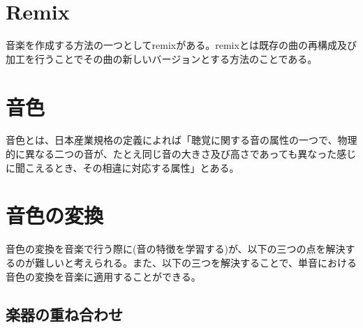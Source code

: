 

\section{Remix}

音楽を作成する方法の一つとしてremixがある。remixとは既存の曲の再構成及び加工を行うことでその曲の新しいバージョンとする方法のことである。





\section{音色}


音色とは、日本産業規格の定義によれば「聴覚に関する音の属性の一つで、物理的に異なる二つの音が、たとえ同じ音の大きさ及び高さであっても異なった感じに聞こえるとき、その相違に対応する属性」とある。


\section{音色の変換}


音色の変換を音楽で行う際に(音の特徴を学習する)が、以下の三つの点を解決するのが難しいと考えられる。また、以下の三つを解決することで、単音における音色の変換を音楽に適用することができる。

\subsection{楽器の重ね合わせ}

